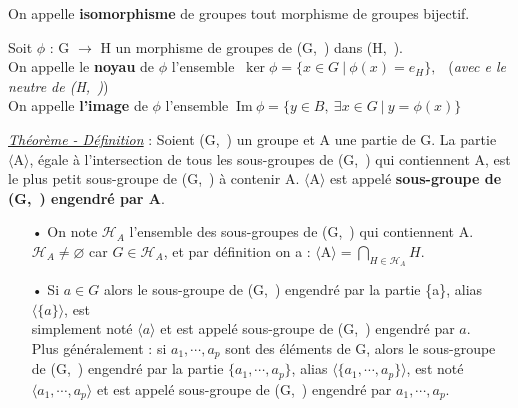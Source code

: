 \noindent On appelle \textbf{isomorphisme} de groupes tout morphisme de groupes bijectif.

\vspace{1cm} 

Soit \( \phi\) : G \(\to\) H un morphisme de groupes de (G,\ \lci) dans (H,\ \lce). \\
On appelle le \textbf{noyau} de \(\phi\) l'ensemble \(\ \ker \phi = \{ x\in G\ | \ \phi (x)=e_H\},\ \ \) (\emph{avec e le neutre de (H,\ \lce)})\\
On appelle \textbf{l'image} de \(\phi\) l'ensemble \(\ \text{Im}\ \phi = \{ y\in B,\ \exists x\in G \ |\ y=\phi(x) \} \)

\vspace{1.3cm}

\underline{\emph{Théorème - Définition}} : Soient (G,\ \lci) un groupe et A une partie de G. La partie \(\bigl \langle \text{A} \bigr \rangle\), égale à l'intersection de tous les sous-groupes de (G,\ \lci) qui contiennent A, est le plus petit sous-groupe de (G,\ \lci) à contenir A. \(\bigl \langle \text{A} \bigr \rangle\) est appelé \textbf{sous-groupe de (G,\ \lci) engendré par A}.\vspace{0.1cm} 
\begin{itemize}[leftmargin=1.5cm]
    \item[•] On note \(\mathcal{H}_A\) l'ensemble des sous-groupes de (G,\ \lci) qui contiennent A.\\
    \(\mathcal{H}_A\neq \varnothing\) car \(G\in \mathcal{H}_A\), et par définition on a : \(\displaystyle \bigl \langle \text{A} \bigr \rangle = \bigcap_{H\in \mathcal{H}_A}\!\!H.\)\vspace{0.1cm}

    \item[•] Si \(a\in G\) alors le sous-groupe de (G,\ \lci) engendré par la partie \{a\}, alias \(\bigl \langle \{a\} \bigr \rangle\), est \\
    simplement noté \(\bigl \langle a \bigr \rangle\) et est appelé sous-groupe de (G,\ \lci) engendré par $a$.\vspace{0.1cm}\\
    Plus généralement : si \(a_1,\cdots,a_p\) sont des éléments de G, alors le sous-groupe de (G,\ \lci) engendré par la partie \(\{a_1,\cdots,a_p\}\), alias \(\bigl \langle \{a_1,\cdots,a_p\} \bigr \rangle\), est noté \(\bigl \langle a_1,\cdots,a_p \bigr \rangle\) et est appelé sous-groupe de (G,\ \lci) engendré par \(a_1,\cdots,a_p\).
\end{itemize}

